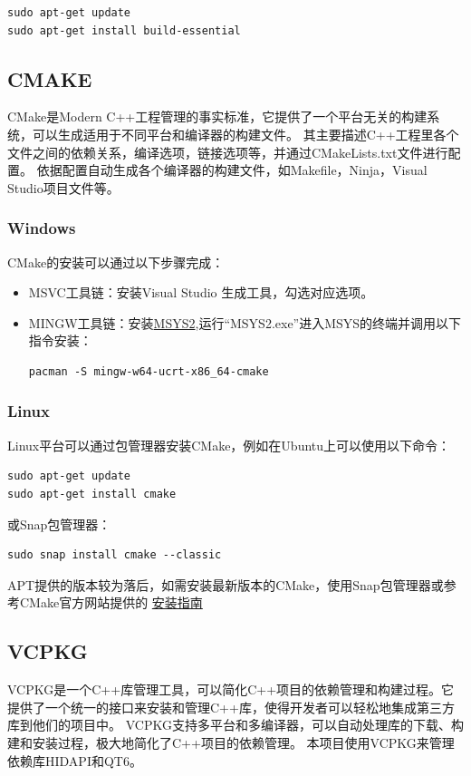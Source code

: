 \documentclass{easybook}
\begin{document}
\begin{lstlisting}
sudo apt-get update
sudo apt-get install build-essential
\end{lstlisting}

\subsection{CMAKE}
CMake是Modern C++工程管理的事实标准，它提供了一个平台无关的构建系统，可以生成适用于不同平台和编译器的构建文件。
其主要描述C++工程里各个文件之间的依赖关系，编译选项，链接选项等，并通过CMakeLists.txt文件进行配置。
依据配置自动生成各个编译器的构建文件，如Makefile，Ninja，Visual Studio项目文件等。
\subsubsection{Windows}
CMake的安装可以通过以下步骤完成：
\begin{itemize}
    \item MSVC工具链：安装Visual Studio 生成工具，勾选对应选项。
    \item MINGW工具链：安装\href{https://www.msys2.org/}{MSYS2},运行“MSYS2.exe”进入MSYS的终端并调用以下指令安装：

\begin{lstlisting}
pacman -S mingw-w64-ucrt-x86_64-cmake
\end{lstlisting}

\end{itemize}
\subsubsection{Linux}
Linux平台可以通过包管理器安装CMake，例如在Ubuntu上可以使用以下命令：

\begin{lstlisting}
sudo apt-get update
sudo apt-get install cmake
\end{lstlisting}
或Snap包管理器：

\begin{lstlisting}
sudo snap install cmake --classic
\end{lstlisting}
APT提供的版本较为落后，如需安装最新版本的CMake，使用Snap包管理器或参考CMake官方网站提供的
\href{https://apt.kitware.com/}{安装指南}

\subsection{VCPKG}
VCPKG是一个C++库管理工具，可以简化C++项目的依赖管理和构建过程。它提供了一个统一的接口来安装和管理C++库，使得开发者可以轻松地集成第三方库到他们的项目中。
VCPKG支持多平台和多编译器，可以自动处理库的下载、构建和安装过程，极大地简化了C++项目的依赖管理。
本项目使用VCPKG来管理依赖库HIDAPI和QT6。
\end{document}
